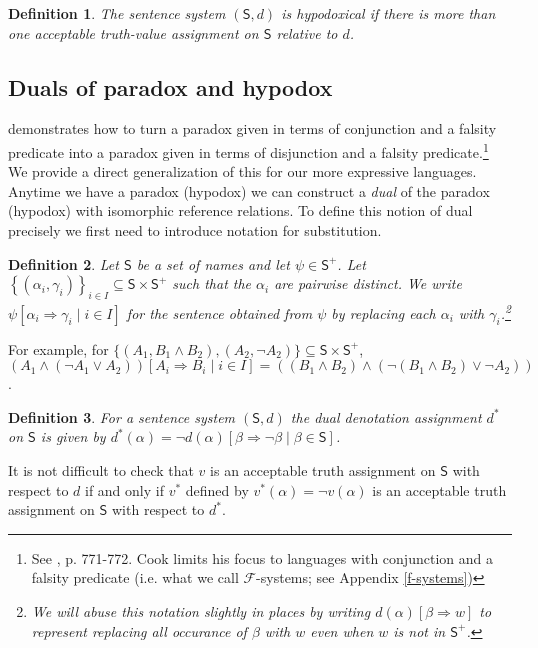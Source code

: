 \documentclass[12pt]{kluwer}
\newtheorem{defn}{Definition}
\theoremstyle{remark}
\newcommand{\fancy}[1]{\mathcal{#1}}
\def\S{\textsf{S}}
\def\F{\fancy{F}}
\def\F{\fancy{F}}
\begin{document}
\begin{defn}
The sentence system $(\S, d)$ is \emph{hypodoxical} if there is more than one acceptable truth-value assignment on $\S$ relative to $d$.
\end{defn}

\subsection{Duals of paradox and hypodox}

\cite{cook} demonstrates how to turn a paradox given in terms of conjunction and a falsity predicate into a paradox given in terms of disjunction and a falsity predicate.\footnote{See \cite{cook}, p. 771-772. Cook limits his focus to languages with conjunction and a falsity predicate (i.e. what we call $\F$-systems; see Appendix \ref{f-systems})} We provide a direct generalization of this for our more expressive languages. Anytime we have a paradox (hypodox) we can construct a \textit{dual} of the paradox (hypodox) with isomorphic reference relations.  To define this notion of dual precisely we first need to introduce notation for substitution.

\begin{defn}
Let $\S$ be a set of names and let $\psi \in \S^+$. Let $\left\{ (\alpha_i, \gamma_i)\right\}_{i \in I} \subseteq \S \times \S^+$ such that the $\alpha_i$ are pairwise distinct. We write $\psi\left[\alpha_i \Rightarrow \gamma_i \mid i \in I\right]$ for the sentence obtained from $\psi$ by replacing each $\alpha_i$ with $\gamma_i$.\footnote{We will abuse this notation slightly in places by writing $d(\alpha)[\beta \Rightarrow w]$ to represent replacing all occurance of $\beta$ with $w$ even when $w$ is not in $\S^+$.}
\end{defn}

For example, for $\{(A_1, B_1 \wedge B_2), ( A_2, \neg A_2) \} \subseteq \S \times \S^+$, $(A_1 \wedge (\neg A_1 \vee A_2))\left[A_i \Rightarrow B_i \mid i \in I\right] = ((B_1 \wedge B_2) \wedge (\neg (B_1 \wedge B_2) \vee \neg A_2))$.


\begin{defn}\label{dualdef}
For a sentence system $(\S, d)$ the \emph{dual} denotation assignment $d^*$ on $\S$ is given by $d^*(\alpha) = \neg d(\alpha)[\beta \Rightarrow \neg \beta \mid \beta \in \S]$.
\end{defn}

It is not difficult to check that $v$ is an acceptable truth assignment on $\S$ with respect to $d$ if and only if $v^*$ defined by $v^*(\alpha) = \neg v(\alpha)$ is an acceptable truth assignment on $\S$ with respect to $d^*$.
\end{document}
